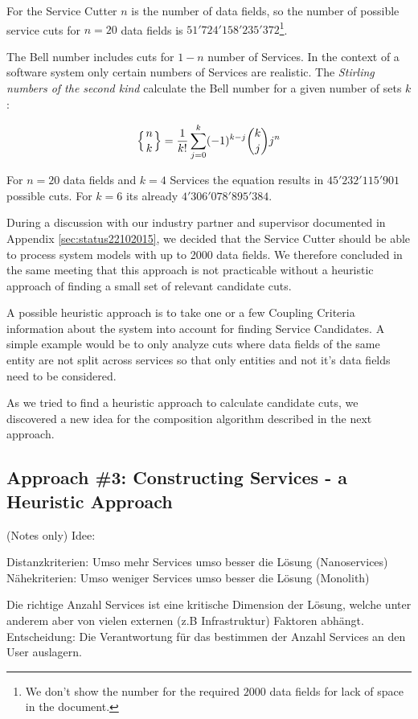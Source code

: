 For the Service Cutter $n$ is the number of data fields, so the number of possible service cuts for $n=20$ data fields is $51'724'158'235'372$\footnote{We don't show the number for the required $2000$ data fields for lack of space in the document.}.

The Bell number includes cuts for $1 - n$ number of Services. In the context of a software system only certain numbers of Services are realistic. The \textit{Stirling numbers of the second kind} calculate the Bell number for a given number of sets $k$:

\begin{displaymath}
\left\{ {n \atop k}\right\} = \frac{1}{k!}\sum_{j=0}^{k} (-1)^{k-j} \binom{k}{j} j^n
\end{displaymath}

For $n=20$ data fields and $k=4$ Services the equation results in $45'232'115'901$ possible cuts. For $k=6$ its already $4'306'078'895'384$.

During a discussion with our industry partner and supervisor documented in Appendix \ref{sec:status22102015}, we decided that the Service Cutter should be able to process system models with up to 2000 data fields. We therefore concluded in the same meeting that this approach is not practicable without a heuristic approach of finding a small set of relevant candidate cuts. 

A possible heuristic approach is to take one or a few Coupling Criteria information about the system into account for finding Service Candidates. A simple example would be to only analyze cuts where data fields of the same entity are not split across services so that only entities and not it's data fields need to be considered.

As we tried to find a heuristic approach to calculate candidate cuts, we discovered a new idea for the composition algorithm described in the next approach. 

\subsection{Approach \#3: Constructing Services - a Heuristic Approach}

(Notes only)
Idee:

Distanzkriterien: Umso mehr Services umso besser die Lösung (Nanoservices)
Nähekriterien: Umso weniger Services umso besser die Lösung (Monolith)

Die richtige Anzahl Services ist eine kritische Dimension der Lösung, welche unter anderem aber von vielen externen (z.B Infrastruktur) Faktoren abhängt. Entscheidung: Die Verantwortung für das bestimmen der Anzahl Services an den User auslagern.

